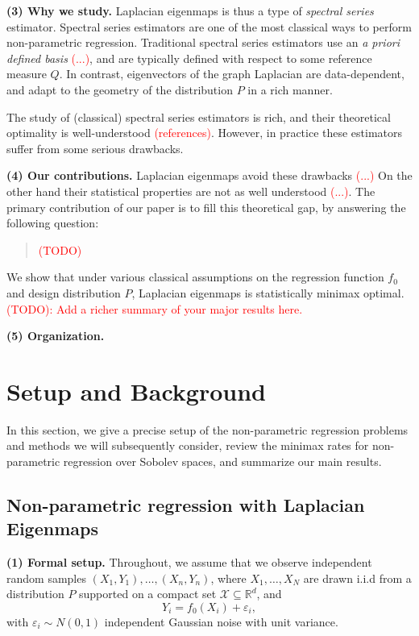 \documentclass{article}
\newcommand{\Reals}{\mathbb{R}}
\newcommand{\1}{\mathbf{1}}
\newcommand{\Rd}{\Reals^d}
\newcommand{\mc}[1]{\mathcal{#1}}
\theoremstyle{alden}
\theoremstyle{aldenthm}
\theoremstyle{definition}
\theoremstyle{remark}
\begin{document}
\textbf{(3) Why we study.} Laplacian eigenmaps is thus a type of \emph{spectral series} estimator. Spectral series estimators are one of the most classical ways to perform non-parametric regression. Traditional spectral series estimators use an \emph{a priori defined basis} \textcolor{red}{(...)}, and are typically defined with respect to some reference measure $Q$. In contrast, eigenvectors of the graph Laplacian are data-dependent, and adapt to the geometry of the distribution $P$ in a rich manner. 

The study of (classical) spectral series estimators is rich, and their theoretical optimality is well-understood \textcolor{red}{(references)}. However, in practice these estimators suffer from some serious drawbacks.

\textbf{(4) Our contributions.} Laplacian eigenmaps avoid these drawbacks \textcolor{red}{(...)} On the other hand their statistical properties are not as well understood \textcolor{red}{(...)}. The primary contribution of our paper is to fill this theoretical gap, by answering the following question:

\begin{quote}
	\textcolor{red}{(TODO)}
\end{quote}

We show that under various classical assumptions on the regression function $f_0$ and design distribution $P$, Laplacian eigenmaps is statistically minimax optimal. \textcolor{red}{(TODO): Add a richer summary of your major results here.} 

\textbf{(5) Organization.}

\section{Setup and Background}
\label{sec:setup_main_results}

In this section, we give a precise setup of the non-parametric regression problems and methods we will subsequently consider, review the minimax rates for non-parametric regression over Sobolev spaces, and summarize our main results.

\subsection{Non-parametric regression with Laplacian Eigenmaps}
\label{sec:regression_laplacian_eigenmaps}

\textbf{(1) Formal setup.}
Throughout, we assume that we observe independent random samples $(X_1,Y_1),\ldots,(X_n,Y_n)$, where $X_1,\ldots,X_N$ are drawn i.i.d from a distribution $P$ supported on a compact set $\mc{X} \subseteq \Rd$, and 
\begin{equation*}
Y_i = f_0(X_i) + \varepsilon_i,
\end{equation*}
with $\varepsilon_i \sim N(0,1)$ independent Gaussian noise with unit variance.
\end{document}
